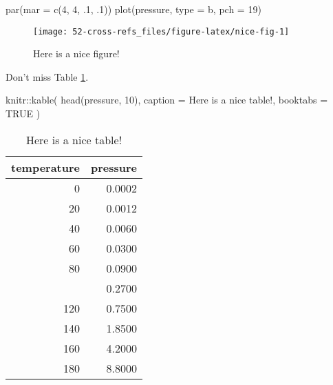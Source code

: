 \documentclass[
]{book}
\newenvironment{Shaded}{\begin{snugshade}}{\end{snugshade}}
\newcommand{\AttributeTok}[1]{\textcolor[rgb]{0.77,0.63,0.00}{#1}}
\newcommand{\ConstantTok}[1]{\textcolor[rgb]{0.00,0.00,0.00}{#1}}
\newcommand{\DecValTok}[1]{\textcolor[rgb]{0.00,0.00,0.81}{#1}}
\newcommand{\FunctionTok}[1]{\textcolor[rgb]{0.00,0.00,0.00}{#1}}
\newcommand{\NormalTok}[1]{#1}
\newcommand{\SpecialCharTok}[1]{\textcolor[rgb]{0.00,0.00,0.00}{#1}}
\newcommand{\StringTok}[1]{\textcolor[rgb]{0.31,0.60,0.02}{#1}}
\theoremstyle{definition}
\theoremstyle{definition}
\theoremstyle{definition}
\theoremstyle{definition}
\theoremstyle{remark}
\begin{document}
\begin{Shaded}
\begin{Highlighting}[]
\FunctionTok{par}\NormalTok{(}\AttributeTok{mar =} \FunctionTok{c}\NormalTok{(}\DecValTok{4}\NormalTok{, }\DecValTok{4}\NormalTok{, .}\DecValTok{1}\NormalTok{, .}\DecValTok{1}\NormalTok{))}
\FunctionTok{plot}\NormalTok{(pressure, }\AttributeTok{type =} \StringTok{\textquotesingle{}b\textquotesingle{}}\NormalTok{, }\AttributeTok{pch =} \DecValTok{19}\NormalTok{)}
\end{Highlighting}
\end{Shaded}

\begin{figure}

{\centering \texttt{[image: 52-cross-refs\_files/figure-latex/nice-fig-1]} 

}

\caption{Here is a nice figure!}\label{fig:nice-fig}
\end{figure}

Don't miss Table \ref{tab:nice-tab}.

\begin{Shaded}
\begin{Highlighting}[]
\NormalTok{knitr}\SpecialCharTok{::}\FunctionTok{kable}\NormalTok{(}
  \FunctionTok{head}\NormalTok{(pressure, }\DecValTok{10}\NormalTok{), }\AttributeTok{caption =} \StringTok{\textquotesingle{}Here is a nice table!\textquotesingle{}}\NormalTok{,}
  \AttributeTok{booktabs =} \ConstantTok{TRUE}
\NormalTok{)}
\end{Highlighting}
\end{Shaded}

\begin{table}

\caption{\label{tab:nice-tab}Here is a nice table!}
\centering
\begin{tabular}[t]{rr}
\toprule
temperature & pressure\\
\midrule
0 & 0.0002\\
20 & 0.0012\\
40 & 0.0060\\
60 & 0.0300\\
80 & 0.0900\\
\addlinespace
100 & 0.2700\\
120 & 0.7500\\
140 & 1.8500\\
160 & 4.2000\\
180 & 8.8000\\
\bottomrule
\end{tabular}
\end{table}
\end{document}
